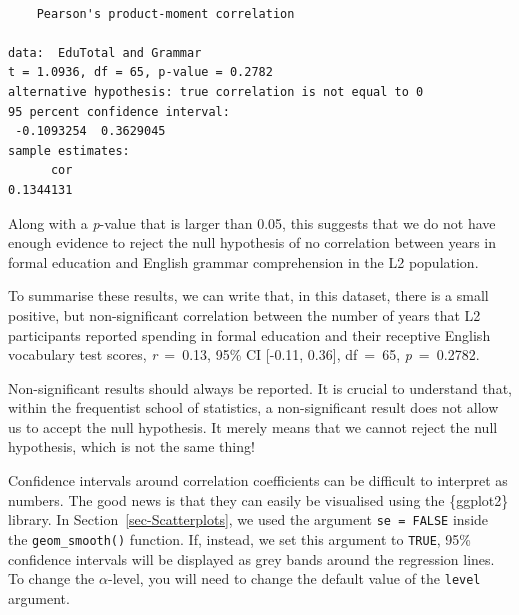 \documentclass[
  letterpaper,
  DIV=11,
  numbers=noendperiod]{scrreprt}
\begin{document}
\begin{verbatim}

    Pearson's product-moment correlation

data:  EduTotal and Grammar
t = 1.0936, df = 65, p-value = 0.2782
alternative hypothesis: true correlation is not equal to 0
95 percent confidence interval:
 -0.1093254  0.3629045
sample estimates:
      cor 
0.1344131 
\end{verbatim}

Along with a \emph{p}-value that is larger than 0.05, this suggests that
we do not have enough evidence to reject the null hypothesis of no
correlation between years in formal education and English grammar
comprehension in the L2 population.

\begin{tcolorbox}[enhanced jigsaw, arc=.35mm, bottomrule=.15mm, bottomtitle=1mm, breakable, colback=white, colbacktitle=quarto-callout-note-color!10!white, colframe=quarto-callout-note-color-frame, coltitle=black, left=2mm, leftrule=.75mm, opacityback=0, opacitybacktitle=0.6, rightrule=.15mm, title=\textcolor{quarto-callout-note-color}{\faInfo}\hspace{0.5em}{How to report non-significant results}, titlerule=0mm, toprule=.15mm, toptitle=1mm]

To summarise these results, we can write that, in this dataset, there is
a small positive, but non-significant correlation between the number of
years that L2 participants reported spending in formal education and
their receptive English vocabulary test scores, \emph{r}~=~0.13, 95\% CI
{[}-0.11, 0.36{]}, df~=~65, \emph{p}~=~0.2782.

Non-significant results should always be reported. It is crucial to
understand that, within the frequentist school of statistics, a
non-significant result does not allow us to accept the null hypothesis.
It merely means that we cannot reject the null hypothesis, which is not
the same thing!

\end{tcolorbox}

Confidence intervals around correlation coefficients can be difficult to
interpret as numbers. The good news is that they can easily be
visualised using the \{ggplot2\} library. In
Section~\ref{sec-Scatterplots}, we used the argument
\texttt{se\ =\ FALSE} inside the \texttt{geom\_smooth()} function. If,
instead, we set this argument to \texttt{TRUE}, 95\% confidence
intervals will be displayed as grey bands around the regression lines.
To change the \(\alpha\)-level, you will need to change the default
value of the \texttt{level} argument.
\end{document}
